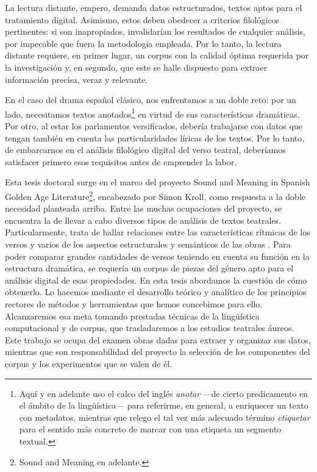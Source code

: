 La lectura distante, empero, demanda datos estructurados, textos aptos para el tratamiento digital. Asimismo, estos deben obedecer a criterios filológicos pertinentes: si son inapropiados, invalidarían los resultados de cualquier análisis, por impecable que fuera la metodología empleada. Por lo tanto, la lectura distante requiere, en primer lugar, un corpus con la calidad óptima requerida por la investigación \parencite{calvo2019} y, en segundo, que este se halle dispuesto para extraer información precisa, veraz y relevante.

En el caso del drama español clásico, nos enfrentamos a un doble reto: por un lado, necesitamos textos anotados\footnote{Aquí y en adelante uso el calco del inglés \textit{anotar} —\nolinebreak de cierto predicamento en el ámbito de la lingüística\nolinebreak— para referirme, en general, a enriquecer un texto con metadatos, mientras que relego el tal vez más adecuado término \textit{etiquetar} para el sentido más concreto de marcar con una etiqueta un segmento textual.} en virtud de sus características dramáticas. Por otro, al estar los parlamentos versificados, debería trabajarse con datos que tengan también en cuenta las particularidades líricas de los textos. Por lo tanto, de embarcarnos en el análisis filológico digital del verso teatral, deberíamos satisfacer primero esos requisitos antes de emprender la labor.

Esta tesis doctoral surge en el marco del proyecto Sound and Meaning in Spanish Golden Age Literature\footnote{Sound and Meaning en adelante.}, encabezado por Simon Kroll, como respuesta a la doble necesidad planteada arriba.  Entre las muchas ocupaciones del proyecto, se encuentra la de llevar a cabo diversos tipos de análisis de textos teatrales. Particularmente, trata de hallar relaciones entre las características rítmicas de los versos y varios de los aspectos estructurales y semánticos de las obras \parencite{kroll2022a}. Para poder comparar grandes cantidades de versos teniendo en cuenta su función en la estructura dramática, se requería un corpus de piezas del género apto para el análisis digital de esas propiedades. En esta tesis abordamos la cuestión de cómo obtenerlo. Lo hacemos mediante el desarrollo teórico y analítico de los principios rectores de métodos y herramientas \parencite{sanz2023b} que hemos concebimos para ello. Alcanzaremos esa meta tomando prestadas técnicas de la lingüística computacional y de corpus, que trasladaremos a los estudios teatrales áureos. Este trabajo se ocupa del examen obras dadas para extraer y organizar sus datos, mientras que son responsabilidad del proyecto la selección de los componentes del corpus y los experimentos que se valen de él.

